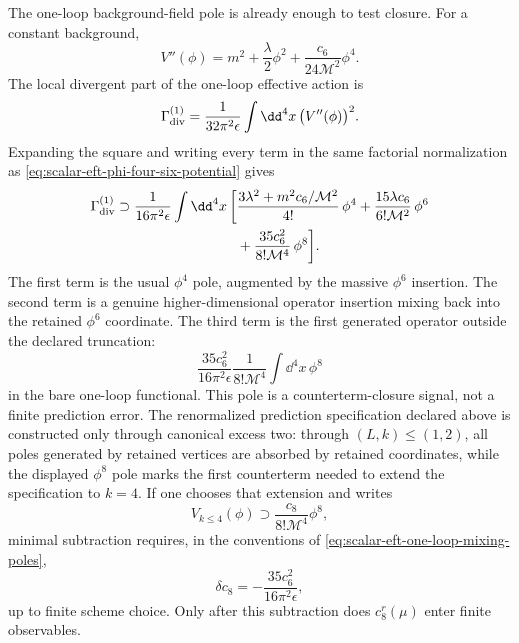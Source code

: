 The one-loop background-field pole is already enough to test closure.  For a
constant background,
\[
  V''(\phi)
  =
  m^2+\frac{\lambda}{2}\phi^2
  +
  \frac{c_6}{24\mathcal M^2}\phi^4 .
\]
The local divergent part of the one-loop effective action is
\begin{equation}
  \Gamma_{\rm div}^{(1)}
  =
  \frac{1}{32\pi^2\epsilon}
  \int\dd^4x\,\bigl(V''(\phi)\bigr)^2 .
  \label{eq:scalar-eft-one-loop-background-pole}
\end{equation}
Expanding the square and writing every term in the same factorial
normalization as \eqref{eq:scalar-eft-phi-four-six-potential} gives
\begin{equation}
\begin{aligned}
  \Gamma_{\rm div}^{(1)}
  \supset
  \frac{1}{16\pi^2\epsilon}\int\dd^4x\,
  \bigg[
  &\frac{3\lambda^2+m^2c_6/\mathcal M^2}{4!}\,\phi^4
  +
  \frac{15\lambda c_6}{6!\mathcal M^2}\,\phi^6  \\
  &+
  \frac{35c_6^2}{8!\mathcal M^4}\,\phi^8
  \bigg].
\end{aligned}
  \label{eq:scalar-eft-one-loop-mixing-poles}
\end{equation}
The first term is the usual \(\phi^4\) pole, augmented by the massive
\(\phi^6\) insertion.  The second term is a genuine higher-dimensional
operator insertion mixing back into the retained \(\phi^6\) coordinate.  The
third term is the first generated operator outside the declared truncation:
\[
  \frac{35c_6^2}{16\pi^2\epsilon}
  \frac{1}{8!\mathcal M^4}
  \int\dd^4x\,\phi^8
\]
in the bare one-loop functional.  This pole is a counterterm-closure signal,
not a finite prediction error.  The renormalized prediction specification
declared above is constructed only through canonical excess two: through
\((L,k)\leq(1,2)\), all poles generated by retained vertices are absorbed by
retained coordinates, while the displayed \(\phi^8\) pole marks the first
counterterm needed to extend the specification to \(k=4\).  If one chooses that
extension and writes
\[
  V_{k\le4}(\phi)\supset
  \frac{c_8}{8!\mathcal M^4}\phi^8,
\]
minimal subtraction requires, in the conventions of
\eqref{eq:scalar-eft-one-loop-mixing-poles},
\[
  \delta c_8
  =
  -\frac{35c_6^2}{16\pi^2\epsilon},
\]
up to finite scheme choice.  Only after this subtraction does \(c_8^r(\mu)\)
enter finite observables.

